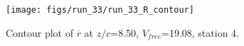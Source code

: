 \begin{figure}[H]
\centering
\texttt{[image: figs/run\_33/run\_33\_R\_contour]}
\caption{Contour plot of $\overline{r}$ at $z/c$=8.50, $V_{free}$=19.08, station 4.}
\label{fig:run_33_R_contour}
\end{figure}


